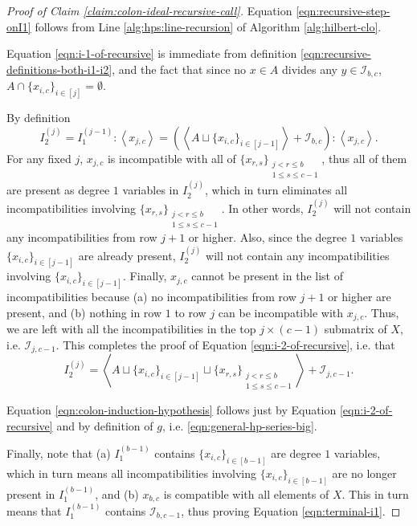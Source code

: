 \documentclass[11pt,reqno]{amsart}
\newcommand{\suchthat}{:}
\newcommand{\ideal}[1]{\left\langle#1\right\rangle}
\theoremstyle{definition}
\numberwithin{equation}{section}
\begin{document}
\begin{proof}[Proof of Claim \ref{claim:colon-ideal-recursive-call}]
Equation \eqref{eqn:recursive-step-onI1} follows from Line \ref{alg:hps:line-recursion} of Algorithm \ref{alg:hilbert-clo}.

Equation \eqref{eqn:i-1-of-recursive} is immediate from definition \eqref{eqn:recursive-definitions-both-i1-i2}, and the fact that since no $x \in A$ divides any $y \in \mathcal{I}_{b, c}$, $A \cap \{x_{i, c}\}_{i \in [j]} = \emptyset$.

By definition \[I_{2}^{(j)} = I_{1}^{(j-1)} \suchthat \ideal{x_{j, c}} = \left(\ideal{A \sqcup \{x_{i, c}\}_{i \in [j-1]}} + \mathcal{I}_{b, c}\right) \suchthat \ideal{x_{j, c}}.\] For any fixed $j$, $x_{j, c}$ is incompatible with all of $\{x_{r,s}\}_{\substack{j < r \le b \\ 1 \le s \le c-1}}$, thus all of them are present as degree $1$ variables in $I_{2}^{(j)}$, which in turn eliminates all incompatibilities involving $\{x_{r,s}\}_{\substack{j < r \le b \\ 1 \le s \le c-1}}$. In other words, $I_2^{(j)}$ will not contain any incompatibilities from row $j+1$ or higher. Also, since the degree $1$ variables $\{x_{i, c}\}_{i \in [j-1]}$ are already present, $I_2^{(j)}$ will not contain any incompatibilities involving $\{x_{i, c}\}_{i \in [j-1]}$. Finally, $x_{j, c}$ cannot be present in the list of incompatibilities because (a) no incompatibilities from row $j+1$ or higher are present, and (b) nothing in row $1$ to row $j$ can be incompatible with $x_{j, c}$. Thus, we are left with all the incompatibilities in the top $j \times (c-1)$ submatrix of $X$, i.e. $\mathcal{I}_{j, c-1}$. This completes the proof of Equation \eqref{eqn:i-2-of-recursive}, i.e. that \[
I_2^{(j)} = \ideal{A \sqcup \{x_{i, c}\}_{i \in [j-1]} \sqcup \{x_{r, s}\}_{\substack{j < r \le b \\ 1 \le s \le c-1}}} + \mathcal{I}_{j, c-1}.\]

Equation \eqref{eqn:colon-induction-hypothesis} follows just by Equation \eqref{eqn:i-2-of-recursive} and by definition of $g$, i.e. \eqref{eqn:general-hp-series-big}.

Finally, note that (a) $I_{1}^{(b-1)}$ contains $\{x_{i, c}\}_{i \in [b-1]}$ are degree $1$ variables, which in turn means all incompatibilities involving $\{x_{i, c}\}_{i \in [b-1]}$ are no longer present in $I_{1}^{(b-1)}$, and (b) $x_{b, c}$ is compatible with all elements of $X$. This in turn means that $I_{1}^{(b-1)}$ contains $\mathcal{I}_{b, c-1}$, thus proving Equation \eqref{eqn:terminal-i1}.
\end{proof}
\end{document}
